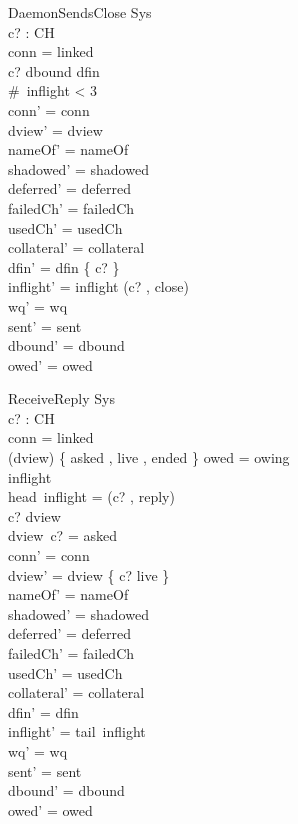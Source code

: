 \documentclass[a4paper,10pt,fleqn]{article}
\begin{document}
\begin{schema}{DaemonSendsClose}
  \Delta Sys \\
  c? : CH \\
\where
  conn = linked \\
  c? \in \dom dbound \setminus dfin \\
  \#~inflight < 3 \\
  conn' = conn \\
  dview' = dview \\
  nameOf' = nameOf \\
  shadowed' = shadowed \\
  deferred' = deferred \\
  failedCh' = failedCh \\
  usedCh' = usedCh \\
  collateral' = collateral \\
  dfin' = dfin \cup \{ c? \} \\
  inflight' = inflight \cat \langle (c? , close) \rangle \\
  wq' = wq \\
  sent' = sent \\
  dbound' = dbound \\
  owed' = owed
\end{schema}

\begin{schema}{ReceiveReply}
  \Delta Sys \\
  c? : CH \\
\where
  conn = linked \\
  (\ran dview) \cap \{ asked , live , ended \} \neq \emptyset \lor owed = owing \\
  inflight \neq \langle \rangle \\
  head~inflight = (c? , reply) \\
  c? \in \dom dview \\
  dview~c? = asked \\
  conn' = conn \\
  dview' = dview \oplus \{ c? \mapsto live \} \\
  nameOf' = nameOf \\
  shadowed' = shadowed \\
  deferred' = deferred \\
  failedCh' = failedCh \\
  usedCh' = usedCh \\
  collateral' = collateral \\
  dfin' = dfin \\
  inflight' = tail~inflight \\
  wq' = wq \\
  sent' = sent \\
  dbound' = dbound \\
  owed' = owed
\end{schema}
\end{document}
